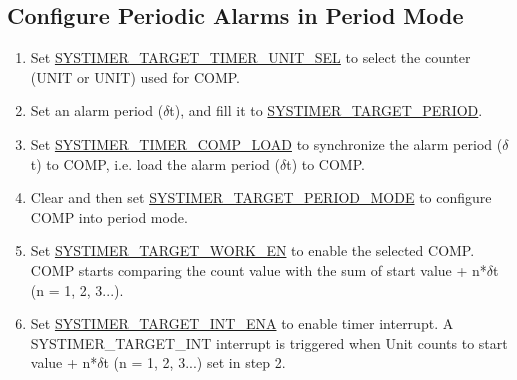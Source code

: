 \documentclass[main\_\_EN.tex]{subfiles}
\begin{document}
\subsection{Configure Periodic Alarms in Period Mode}
\begin{enumerate}
    \item Set \hyperref[fielddesc:SYSTIMERTARGET0TIMERUNITSEL]{SYSTIMER\_TARGET\_TIMER\_UNIT\_SEL} to select the counter (UNIT or UNIT) used for COMP.
    \item Set an alarm period ($\delta$t), and fill it to \hyperref[fielddesc:SYSTIMERTARGET0PERIOD]{SYSTIMER\_TARGET\_PERIOD}.
    \item Set \hyperref[fielddesc:SYSTIMERTIMERCOMP0LOAD]{SYSTIMER\_TIMER\_COMP\_LOAD} to synchronize the alarm period ($\delta$t) to COMP, i.e. load the alarm period ($\delta$t) to COMP.
    \item Clear and then set \hyperref[fielddesc:SYSTIMERTARGET0PERIODMODE]{SYSTIMER\_TARGET\_PERIOD\_MODE} to configure COMP into period mode.
    \item Set \hyperref[fielddesc:SYSTIMERTARGET0WORKEN]{SYSTIMER\_TARGET\_WORK\_EN} to enable the selected COMP. COMP starts comparing the count value with the sum of start value + n*$\delta$t (n = 1, 2, 3...).
    \item Set \hyperref[fielddesc:SYSTIMERTARGET0INTENA]{SYSTIMER\_TARGET\_INT\_ENA} to enable timer interrupt. A SYSTIMER\_TARGET\_INT interrupt is triggered when Unit counts to start value + n*$\delta$t (n = 1, 2, 3...) set in step 2.
\end{enumerate}
\end{document}
